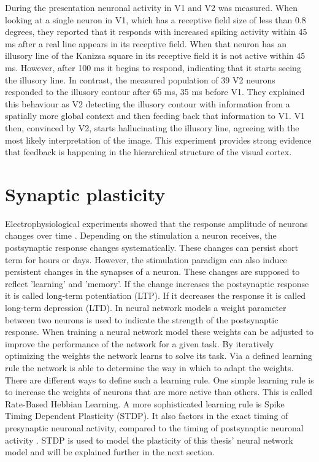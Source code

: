 During the presentation neuronal activity in V1 and V2 was measured. When looking at a single neuron in V1, which has a receptive field size of less than 0.8 degrees, they reported that it responds with increased spiking activity within 45 ms after a real line appears in its receptive field. When that neuron has an illusory line of the Kanizsa square in its receptive field it is not active within 45 ms. However, after 100 ms it begins to respond, indicating that it starts seeing the illusory line. In contrast, the measured population of 39 V2 neurons responded to the illusory contour after 65 ms, 35 ms before V1. They explained this behaviour as V2 detecting the illusory contour with information from a spatially more global context and then feeding back that information to V1. V1 then, convinced by V2, starts hallucinating the illusory line, agreeing with the most likely interpretation of the image. This experiment provides strong evidence that feedback is happening in the hierarchical structure of the visual cortex.

\section{Synaptic plasticity}

Electrophysiological experiments showed that the response amplitude of neurons changes over time \citep{STDPEvidence}. Depending on the stimulation a neuron receives, the postsynaptic response changes systematically. These changes can persist short term for hours or days. However, the stimulation paradigm can also induce persistent changes in the synapses of a neuron. These changes are supposed to reflect 'learning' and 'memory'. If the change increases the postsynaptic response it is called long-term potentiation (LTP). If it decreases the response it is called long-term depression (LTD).
In neural network models a weight parameter between two neurons is used to indicate the strength of the postsynaptic response. When training a neural network model these weights can be adjusted to improve the performance of the network for a given task. By iteratively optimizing the weights the network learns to solve its task. Via a defined learning rule the network is able to determine the way in which to adapt the weights. There are different ways to define such a learning rule. One simple learning rule is to increase the weights of neurons that are more active than others. This is called Rate-Based Hebbian Learning. A more sophisticated learning rule  is Spike Timing Dependent Plasticity (STDP). It also factors in the exact timing of presynaptic neuronal activity, compared to the timing of postsynaptic neuronal activity \citep{SpikingNeuronModelsBook}. STDP is  used to model the plasticity of this thesis' neural network model and will be explained further in the next section.


